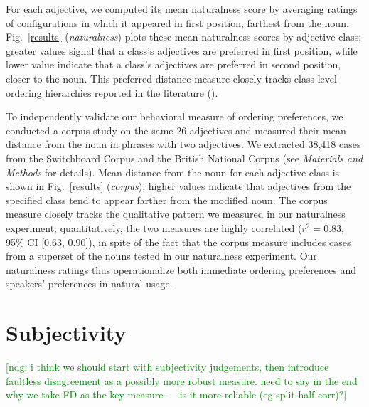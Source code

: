 \documentclass{pnastwo}
\newcommand{\ndg}[1]{\textcolor{Green}{[ndg: #1]}}
\begin{document}
\begin{article}
For each adjective, we computed its mean naturalness score by averaging ratings of configurations in which it appeared in first position, farthest from the noun. Fig.\ \ref{results} (\emph{naturalness}) plots these mean naturalness scores by adjective class; greater values signal that a class's adjectives are preferred in first position, while lower value indicate that a class's adjectives are preferred in second position, closer to the noun. This preferred distance measure closely tracks class-level ordering hierarchies reported in the literature (\cite{dixon1982,sproatshih1991}).

To independently validate our behavioral measure of ordering preferences, we conducted a corpus study on the same 26 adjectives and measured their mean distance from the noun in phrases with two adjectives. We extracted 38,418 cases from the Switchboard Corpus and the British National Corpus (see \emph{Materials and Methods} for details). Mean distance from the noun for each adjective class is shown in Fig.~\ref{results} (\emph{corpus}); higher values indicate that adjectives from the specified class tend to appear farther from the modified noun. The corpus measure closely tracks the qualitative pattern we measured in our naturalness experiment; quantitatively, the two measures are highly correlated ($r^{2}=0.83$, 95\% CI [0.63, 0.90]), in spite of the fact that the corpus measure includes cases from a superset of the nouns tested in our naturalness experiment. Our naturalness ratings thus operationalize both immediate ordering preferences and speakers' preferences in natural usage.


\section{Subjectivity}

\ndg{i think we should start with subjectivity judgements, then introduce faultless disagreement as a possibly more robust measure. need to say in the end why we take FD as the key measure --- is it more reliable (eg split-half corr)?}


\end{article}
\end{document}
